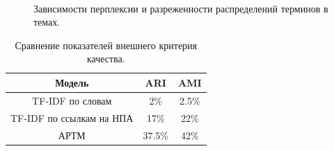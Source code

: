 \documentclass[12pt]{article}
\begin{document}
\begin{figure}[H]
  \\
\caption{Зависимости перплексии и разреженности распределений терминов в темах.}
\label{fg:Example}
\end{figure}

\begin{table}[H]
\caption{\label{tab:summary}Сравнение показателей внешнего критерия качества.}
\begin{center}
\begin{tabular}{|c|c|c|}
\hline
Модель & ARI & AMI\\
\hline
TF-IDF по словам & 2\% & 2.5\% \\
\hline
TF-IDF по ссылкам на НПА & 17\% & 22\% \\
\hline
АРТМ & 37.5\% & 42\% \\
\hline
\end{tabular}
\end{center}
\end{table}
\end{document}
